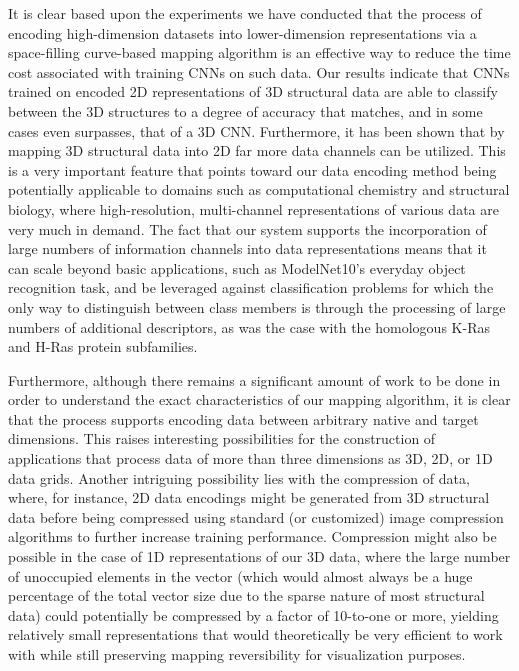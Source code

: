 \documentclass{article}
\begin{document}
It is clear based upon the experiments we have conducted that the process of encoding high-dimension datasets into lower-dimension representations via a space-filling curve-based mapping algorithm is an effective way to reduce the time cost associated with training CNNs on such data. Our results indicate that CNNs trained on encoded 2D representations of 3D structural data are able to classify between the 3D structures to a degree of accuracy that matches, and in some cases even surpasses, that of a 3D CNN. Furthermore, it has been shown that by mapping 3D structural data into 2D far more data channels can be utilized. This is a very important feature that points toward our data encoding method being potentially applicable to domains such as computational chemistry and structural biology, where high-resolution, multi-channel representations of various data are very much in demand. The fact that our system supports the incorporation of large numbers of information channels into data representations means that it can scale beyond basic applications, such as ModelNet10's everyday object recognition task, and be leveraged against classification problems for which the only way to distinguish between class members is through the processing of large numbers of additional descriptors, as was the case with the homologous K-Ras and H-Ras protein subfamilies. 

Furthermore, although there remains a significant amount of work to be done in order to understand the exact characteristics of our mapping algorithm, it is clear that the process supports encoding data between arbitrary native and target dimensions. This raises interesting possibilities for the construction of applications that process data of more than three dimensions as 3D, 2D, or 1D data grids. Another intriguing possibility lies with the compression of data, where, for instance, 2D data encodings might be generated from 3D structural data before being compressed using standard (or customized) image compression algorithms to further increase training performance. Compression might also be possible in the case of 1D representations of our 3D data, where the large number of unoccupied elements in the vector (which would almost always be a huge percentage of the total vector size due to the sparse nature of most structural data) could potentially be compressed by a factor of 10-to-one or more, yielding relatively small representations that would theoretically be very efficient to work with while still preserving mapping reversibility for visualization purposes.
\end{document}

